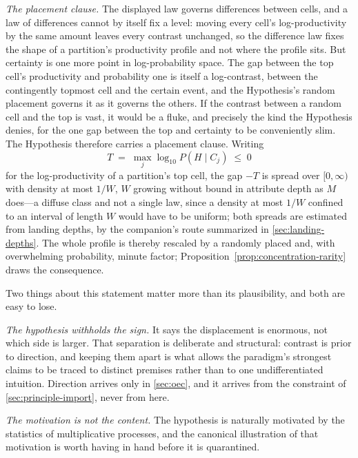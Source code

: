 \documentclass[11pt]{article}
\theoremstyle{definition}
\begin{document}
\noindent\emph{The placement clause.} The displayed law governs differences between cells, and a law of differences cannot by itself fix a level: moving every cell's log-productivity by the same amount leaves every contrast unchanged, so the difference law fixes the shape of a partition's productivity profile and not where the profile sits. But certainty is one more point in log-probability space. The gap between the top cell's productivity and probability one is itself a log-contrast, between the contingently topmost cell and the certain event, and the Hypothesis's random placement governs it as it governs the others. If the contrast between a random cell and the top is vast, it would be a fluke, and precisely the kind the Hypothesis denies, for the one gap between the top and certainty to be conveniently slim. The Hypothesis therefore carries a placement clause. Writing
\begin{equation}
\label{eq:placement}
T \;=\; \max_j \log_{10} P(H \mid C_j) \;\le\; 0
\end{equation}
for the log-productivity of a partition's top cell, the gap $-T$ is spread over $[0, \infty)$ with density at most $1/W$, $W$ growing without bound in attribute depth as $M$ does---a diffuse class and not a single law, since a density at most $1/W$ confined to an interval of length $W$ would have to be uniform; both spreads are estimated from landing depths, by the companion's route summarized in \autoref{sec:landing-depths}. The whole profile is thereby rescaled by a randomly placed and, with overwhelming probability, minute factor; Proposition~\ref{prop:concentration-rarity} draws the consequence.


Two things about this statement matter more than its plausibility, and both are easy to lose.

\emph{The hypothesis withholds the sign.} It says the displacement is enormous, not which side is larger. That separation is deliberate and structural: contrast is prior to direction, and keeping them apart is what allows the paradigm's strongest claims to be traced to distinct premises rather than to one undifferentiated intuition. Direction arrives only in \autoref{sec:oec}, and it arrives from the constraint of \autoref{sec:principle-import}, never from here.

\emph{The motivation is not the content.} The hypothesis is naturally motivated by the statistics of multiplicative processes, and the canonical illustration of that motivation is worth having in hand before it is quarantined.
\end{document}
